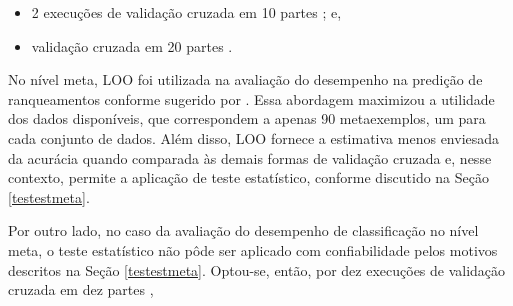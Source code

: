 \begin{itemize}
 \item 2 execuções de validação cruzada em 10 partes \cite{conf/ecml/KornerW06,conf/icml/MelvilleM04}; e,%
 \item validação cruzada em 20 partes \cite{conf/ijcai/MusleaMK03}. %
\end{itemize}

No nível meta, LOO foi utilizada na avaliação do desempenho na predição de ranqueamentos conforme sugerido por .
Essa abordagem maximizou a utilidade dos dados disponíveis, que correspondem a apenas 90 metaexemplos, um para cada conjunto de dados.
Além disso, LOO fornece a estimativa menos enviesada da acurácia quando comparada às demais formas de validação cruzada \cite{conf/icml/Joachims00} e, nesse contexto, permite a aplicação de teste estatístico, conforme discutido na Seção \ref{testestmeta}.

Por outro lado, no caso da avaliação do desempenho de classificação no nível meta, o teste estatístico não pôde ser aplicado com confiabilidade pelos motivos descritos na Seção \ref{testestmeta}.
Optou-se, então, por dez execuções de validação cruzada em dez partes \cite{conf/pakdd/BouckaertF04}, 

% 


